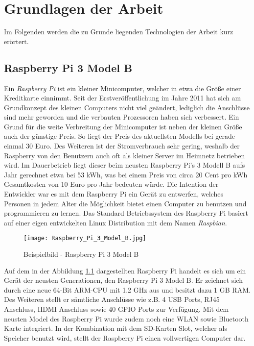 
\chapter{Grundlagen der Arbeit}

Im Folgenden werden die zu Grunde liegenden Technologien der Arbeit kurz erörtert.

\section{Raspberry Pi 3 Model B}
Ein \textit{Raspberry Pi} ist ein kleiner Minicomputer, welcher in etwa die
Größe einer Kreditkarte einnimmt. Seit der Erstveröffentlichung im Jahre 2011
hat sich am Grundkonzept des kleinen Computers nicht viel
geändert, lediglich die Anschlüsse sind mehr geworden und die verbauten
Prozessoren haben sich verbessert. 
Ein Grund für die weite Verbreitung der Minicomputer ist neben der kleinen
Größe auch der günstige Preis. So liegt der Preis des aktuellsten Modells bei
gerade einmal 30 Euro. Des Weiteren ist der Stromverbrauch sehr gering,
weshalb der Raspberry von den Benutzern auch oft als kleiner Server im Heimnetz
betrieben wird. Im Dauerbetrieb liegt dieser beim neusten Raspberry
Pi's 3 Modell B aufs Jahr gerechnet etwa bei 53 kWh, was bei einem Preis von
circa 20 Cent pro kWh Gesamtkosten von 10 Euro pro Jahr bedeuten würde. \newline
Die Intention der Entwickler war es mit dem Raspberry Pi ein Gerät zu
entwerfen, welches Personen in jedem Alter die Möglichkeit bietet einen
Computer zu benutzen und programmieren zu lernen. Das Standard Betriebssystem
des Raspberry Pi basiert auf einer eigen entwickelten Linux Distribution mit
dem Namen \textit{Raspbian}.
\autocite{what_is_a_raspberry_pi?_2019}
\begin{figure}[h]
	\centering
	\texttt{[image: Raspberry\_Pi\_3\_Model\_B.jpg]}
	\caption{Beispielbild - Raspberry Pi 3 Model B \autocite{raspberry_pi_2019}}
	\label{img:grafik-RaspberryPi3}
\end{figure}
\newline

Auf dem in der Abbildung \ref{img:grafik-RaspberryPi3} dargestellten Raspberry
Pi handelt es sich um ein Gerät der neusten Generationen, den Raspberry Pi 3
Model B. Er zeichnet sich durch eine neue 64-Bit \ac{ARM}-\ac{CPU} mit 1.2
\ac{GHz} aus und besitzt dazu 1 \ac{GB} \ac{RAM}. Des Weiteren stellt er
sämtliche Anschlüsse wie z.B. 4 \ac{USB} Ports, RJ45 Anschluss, \ac{HDMI}
Anschluss sowie 40 \ac{GPIO} Ports zur Verfügung. Mit dem neusten Model des
Raspberry Pi wurde zudem noch eine \ac{WLAN} sowie Bluetooth Karte integriert.
In der Kombination mit dem \ac{SD-Karten} Slot, welcher als Speicher benutzt
wird, stellt der Raspberry Pi einen vollwertigen Computer dar.
\autocite{kurniawan_2016}
 
